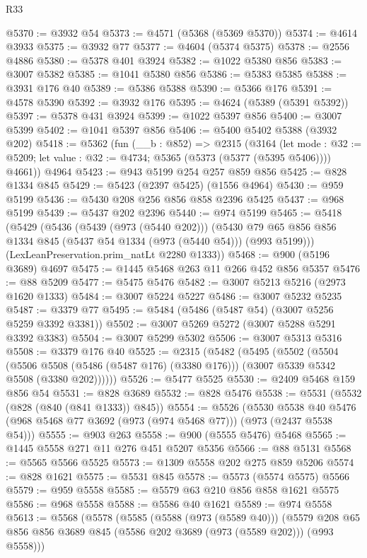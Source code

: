 \begin{lexlean}{R33}
\begin{coremodule}
@5370 := @3932 @54
@5373 := @4571 (@5368 (@5369 @5370))
@5374 := @4614 @3933
@5375 := @3932 @77
@5377 := @4604 (@5374 @5375)
@5378 := @2556 @4886
@5380 := @5378 @401 @3924
@5382 := @1022 @5380 @856
@5383 := @3007 @5382
@5385 := @1041 @5380 @856
@5386 := @5383 @5385
@5388 := @3931 @176 @40
@5389 := @5386 @5388
@5390 := @5366 @176
@5391 := @4578 @5390
@5392 := @3932 @176
@5395 := @4624 (@5389 (@5391 @5392))
@5397 := @5378 @431 @3924
@5399 := @1022 @5397 @856
@5400 := @3007 @5399
@5402 := @1041 @5397 @856
@5406 := @5400 @5402 @5388 (@3932 @202)
@5418 := @5362
    (fun (__b : @852) =>
    @2315
      (@3164
        (let mode : @32 := @5209; let value : @32 := @4734; @5365 (@5373 (@5377 (@5395 @5406))))
        @4661))
    @4964
@5423 := @943 @5199 @254 @257 @859 @856
@5425 := @828 @1334 @845
@5429 := @5423 (@2397 @5425) (@1556 @4964)
@5430 := @959 @5199
@5436 := @5430 @208 @256 @856 @858 @2396 @5425
@5437 := @968 @5199
@5439 := @5437 @202 @2396
@5440 := @974 @5199
@5465 := @5418
    (@5429
      (@5436
        (@5439 (@973 (@5440 @202)))
        (@5430 @79 @65 @856 @856 @1334 @845 (@5437 @54 @1334 (@973 (@5440 @54))) (@993 @5199)))
      (LexLeanPreservation.prim_natLt @2280 @1333))
@5468 := @900 (@5196 @3689) @4697
@5475 := @1445 @5468 @263 @11 @266 @452 @856 @5357
@5476 := @88 @5209
@5477 := @5475 @5476
@5482 := @3007 @5213 @5216 (@2973 @1620 @1333)
@5484 := @3007 @5224 @5227
@5486 := @3007 @5232 @5235
@5487 := @3379 @77
@5495 := @5484 (@5486 (@5487 @54) (@3007 @5256 @5259 @3392 @3381))
@5502 := @3007 @5269 @5272 (@3007 @5288 @5291 @3392 @3383)
@5504 := @3007 @5299 @5302
@5506 := @3007 @5313 @5316
@5508 := @3379 @176 @40
@5525 := @2315
    (@5482
      (@5495
        (@5502
          (@5504
            (@5506 @5508 (@5486 (@5487 @176) (@3380 @176)))
            (@3007 @5339 @5342 @5508 (@3380 @202))))))
@5526 := @5477 @5525
@5530 := @2409 @5468 @159 @856 @54
@5531 := @828 @3689
@5532 := @828 @5476
@5538 := @5531 (@5532 (@828 (@840 (@841 @1333)) @845))
@5554 := @5526
    (@5530 @5538 @40 @5476 (@968 @5468 @77 @3692 (@973 (@974 @5468 @77))) (@973 (@2437 @5538 @54)))
@5555 := @903 @263
@5558 := @900 (@5555 @5476) @5468
@5565 := @1445 @5558 @271 @11 @276 @451 @5207 @5356
@5566 := @88 @5131
@5568 := @5565 @5566 @5525
@5573 := @1309 @5558 @202 @275 @859 @5206
@5574 := @828 @1621
@5575 := @5531 @845
@5578 := @5573 (@5574 @5575) @5566
@5579 := @959 @5558
@5585 := @5579 @63 @210 @856 @858 @1621 @5575
@5586 := @968 @5558
@5588 := @5586 @40 @1621
@5589 := @974 @5558
@5613 := @5568
    (@5578
      (@5585
        (@5588 (@973 (@5589 @40)))
        (@5579 @208 @65 @856 @856 @3689 @845 (@5586 @202 @3689 (@973 (@5589 @202))) (@993 @5558)))

\end{coremodule}
\end{lexlean}
